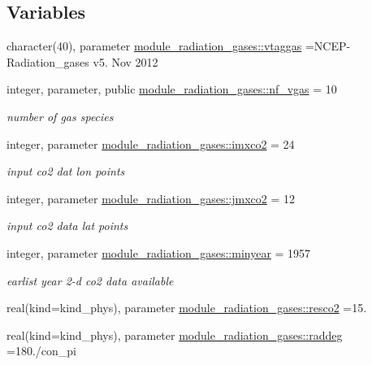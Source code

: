 \subsection*{Variables}
\begin{DoxyCompactItemize}
\item 
character(40), parameter \hyperlink{namespacemodule__radiation__gases_a8a79a6d3d931da021cd19290c58bdfaa}{module\+\_\+radiation\+\_\+gases\+::vtaggas} =\textquotesingle{}N\+C\+EP-\/Radiation\+\_\+gases v5. Nov 2012 \textquotesingle{}
\item 
integer, parameter, public \hyperlink{namespacemodule__radiation__gases_affc350828412da77ff3cf3e617ddc66c}{module\+\_\+radiation\+\_\+gases\+::nf\+\_\+vgas} = 10
\begin{DoxyCompactList}\small\item\em number of gas species \end{DoxyCompactList}\item 
integer, parameter \hyperlink{namespacemodule__radiation__gases_a46eb4079ff9932819b3ab133bf6a43d9}{module\+\_\+radiation\+\_\+gases\+::imxco2} = 24
\begin{DoxyCompactList}\small\item\em input co2 dat lon points \end{DoxyCompactList}\item 
integer, parameter \hyperlink{namespacemodule__radiation__gases_aa56e209872093bfcbdaeb452f5e5e332}{module\+\_\+radiation\+\_\+gases\+::jmxco2} = 12
\begin{DoxyCompactList}\small\item\em input co2 data lat points \end{DoxyCompactList}\item 
integer, parameter \hyperlink{namespacemodule__radiation__gases_a3b26af64187b57999cadeced419b0f1b}{module\+\_\+radiation\+\_\+gases\+::minyear} = 1957
\begin{DoxyCompactList}\small\item\em earlist year 2-\/d co2 data available \end{DoxyCompactList}\item 
real(kind=kind\+\_\+phys), parameter \hyperlink{namespacemodule__radiation__gases_afda5c1d1129d865b9772e0f58dea7598}{module\+\_\+radiation\+\_\+gases\+::resco2} =15.
\item 
real(kind=kind\+\_\+phys), parameter \hyperlink{namespacemodule__radiation__gases_aa5873ae54e950001ff873771378e7a1e}{module\+\_\+radiation\+\_\+gases\+::raddeg} =180./con\+\_\+pi

\end{DoxyCompactItemize}
